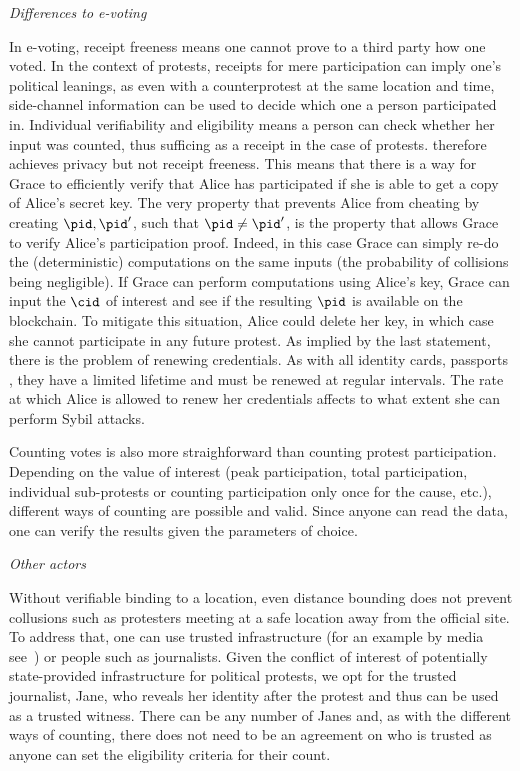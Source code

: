 \emph{Differences to e-voting}

In e-voting, receipt freeness means one cannot prove to a third party
how one voted. In the context of protests, receipts for mere
participation can imply one's political leanings, as even with a
counterprotest at the same location and time, side-channel information
can be used to decide which one a person participated in. Individual
verifiability and eligibility means a person can check whether her input was counted,
thus sufficing as a receipt in the case of protests. 
\PRIVO therefore achieves privacy but not receipt freeness.
This means that there is a way for Grace to efficiently verify that
Alice has participated if she is able to get a copy of Alice's secret
key. The very property that prevents Alice from cheating by creating \(\pid, \pid'\), 
such that \(\pid \neq \pid'\), is the property that allows Grace to verify 
Alice's participation proof.
Indeed, in this case Grace can simply re-do the (deterministic)
computations on the same inputs (the probability of collisions being
negligible).
If Grace can perform computations using Alice's key, Grace can input the 
\(\cid\) of interest and see if the resulting \(\pid\) is available on the 
blockchain.
To mitigate this situation, Alice could delete her key, in which case she cannot 
participate in any future protest.
As implied by the last statement, there is the problem of renewing credentials.
As with all identity cards, passports \etc, they have a limited lifetime and 
must be renewed at regular intervals.
The rate at which Alice is allowed to renew her credentials affects to what 
extent she can perform Sybil attacks.

Counting votes is also more straighforward than counting protest
participation. Depending on the value of interest (peak participation,
total participation, individual sub-protests or counting participation
only once for the cause, etc.), different ways of counting are
possible and valid. Since anyone can read the data, one can verify the
results given the parameters of choice.

\emph{Other actors}

Without verifiable binding to a location, even distance bounding does
not prevent collusions such as protesters meeting at a safe location
away from the official site. To address that, one can use trusted
infrastructure (for an example by media see~\cite{LeMondeProtestingSolution}) or people
such as journalists. Given the conflict of interest of potentially
state-provided infrastructure for political protests, we opt for the
trusted journalist, Jane, who reveals her identity after the protest
and thus can be used as a trusted witness. There can be any number of
Janes and, as with the different ways of counting, there does not need
to be an agreement on who is trusted as anyone can set the eligibility
criteria for their count.

